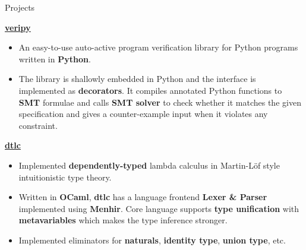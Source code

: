 \documentclass{cv}
\newcommand{\myul}[2][blue]{\setulcolor{#1}\ul{#2}\setulcolor{blue}}
\begin{document}
	\begin{rSection}{Projects}

		\textbf{\href{https://github.com/AD1024/veripy}{\color{blue} \myul{veripy}}} %
		\vspace{-5pt}

		\begin{itemize}
			\setlength{\itemsep}{1pt}
            \setlength{\parskip}{0pt}
			\setlength{\parsep}{0pt}
			\item An easy-to-use auto-active program verification library for Python programs written in \textbf{Python}.
			\item The library is shallowly embedded in Python and the interface is implemented as \textbf{decorators}. It compiles annotated Python functions to \textbf{SMT} formulae and calls \textbf{SMT solver} to check whether it matches the given specification and gives a counter-example input when it violates any constraint.
		\end{itemize}

		\textbf{\href{https://github.com/AD1024/dtlc}{\color{blue} \myul{dtlc}}} %
		\vspace{-5pt}

		\begin{itemize}
			\setlength{\itemsep}{1pt}
            \setlength{\parskip}{0pt}
			\setlength{\parsep}{0pt}
			\item Implemented \textbf{dependently-typed} lambda calculus in Martin-Löf style intuitionistic type theory.
			\item Written in \textbf{OCaml}, \textbf{dtlc} has a language frontend \textbf{Lexer \& Parser} implemented using \textbf{Menhir}. Core language supports \textbf{type unification} with \textbf{metavariables} which makes the type inference stronger.
			\item Implemented eliminators for \textbf{naturals}, \textbf{identity type}, \textbf{union type}, etc.
		\end{itemize}


\end{rSection}
\end{document}
